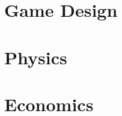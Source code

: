 \documentclass{article}
\begin{document}
\section{Game Design}

\section{Physics}

\section{Economics}
\end{document}
